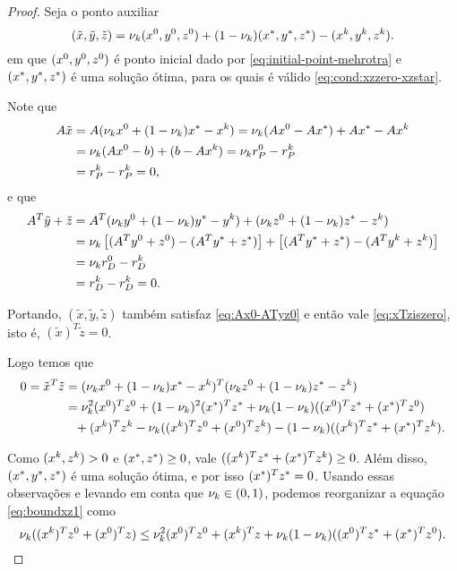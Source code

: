 \begin{proof}
	Seja o ponto auxiliar
	\[
		(\tilde{x},\tilde{y},\tilde{z})  = \nu_{k} (x^0,y^0,z^0) + (1-\nu_{k} )(x^*,y^*,z^*) - (x^{k},y^{k},z^{k}). 
	\]
em que $(x^0,y^0,z^0)$ é ponto inicial dado por \eqref{eq:initial-point-mehrotra} e $(x^*,y^*,z^*)$ é  uma solução ótima, para os quais é válido \eqref{eq:cond:xzzero-xzstar}.


Note que 
\[
\begin{aligned}
A\tilde{x} & = A(\nu_{k} x^0+ (1-\nu_{k} )x^* -x^{k}) = \nu_{k} (Ax^0 - Ax^*) + Ax^* - Ax^{k}   \\
& = \nu_{k} (Ax^0 - b) + (b - Ax^{k}) = \nu_{k}  r_{P}^{0} - r_{P}^{k}  \\
 & = r_{P}^{k} - r_{P}^{k} = 0,  
\end{aligned}
\]
e que
\[
\begin{aligned}
A^{T}\tilde{y} + \tilde{z}  & = 	A^{T}(\nu_{k} y^0 + (1-\nu_{k} )y^* - y^{k}) + (\nu_{k} z^0 + (1-\nu_{k} )z^* - z^{k}) \\
							&  =  \nu_{k}  \left[(A^{T}y^0  +z^0)  - (A^{T}y^*  +z^*)  \right]+  \left[(A^{T}y^*  +z^*)  - (A^{T}y^{k}  +z^{k})  \right]  \\
							& = \nu_{k}  r_{D}^{0} - r_{D}^{k}  \\
 & = r_{D}^{k} - r_{D}^{k} = 0.   
\end{aligned}
\]


Portando, $(\tilde{x},\tilde{y},\tilde{z})$ também satisfaz \eqref{eq:Ax0-ATyz0} e então vale \eqref{eq:xTziszero}, isto é, $(\tilde{x})^{T}\tilde{z} = 0$. 

Logo temos que 
\begin{align}
	0  = \tilde{x}^{T}\tilde{z} & = (\nuk \xzero + (1-\nuk )\xstar -\xk)^{T}(\nuk \zzero + (1-\nuk )\zstar -\zk)\notag\\
	  & = \nuk ^{2}(\xzero)^T\zzero + (1-\nuk )^{2}(\xstar)^{T}\zstar + \nuk (1-\nuk )((\xzero)^{T}\zstar + (\xstar)^{T}\zzero) \notag\\
	  & \textcolor{white}{=} +(\xk)^{T}\zk - \nuk  ((\xk)^{T}\zzero + (\xzero)^{T}\zk) - (1-\nuk ) ((\xk)^{T}\zstar + (\xstar)^{T}\zk).\label{eq:boundxz1}
\end{align}

Como  $(x^{k},z^{k})>0$ e $(x^*,z^*)\geq 0$, vale $((x^{k})^{T}z^* + (x^*)^{T}z^{k}) \geq 0$. Além disso, $(x^*,y^*,z^*)$ é uma solução ótima, e por isso $(x^*)^{T}z^* = 0$. Usando essas observações e levando em conta que $\nu_{k} \in(0,1)$,  podemos reorganizar  a equação \eqref{eq:boundxz1} como
\begin{equation}
	\label{eq:xTzero+xzeroTz}
	  \nu_{k}  ((x^{k})^{T}z^0 + (x^0)^{T}z) \leq 
  \nu_{k} ^{2}(x^0)^Tz^0  + (x^{k})^{T}z+  \nu_{k} (1-\nu_{k} )((x^0)^{T}z^* + (x^*)^{T}z^0).
\end{equation}


\end{proof}
